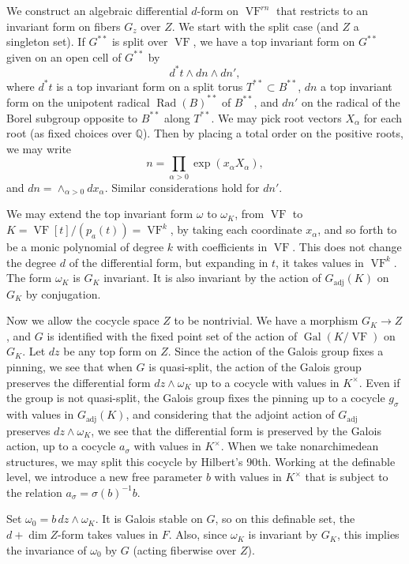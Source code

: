 \documentclass[12pt]{amsart}
\newcommand{\op}[1]{\operatorname{#1}}
\newcommand{\ring}[1]{{\mathbb #1}}
\def\VF{{\op{VF}}}
\theoremstyle{plain}
\theoremstyle{definition}
\begin{document}
We construct an algebraic differential $d$-form on $\VF^{rn}$ that
restricts to an invariant form on fibers $G_z$ over $Z$.  We start
with the split case (and $Z$ a singleton set).  If $G^{**}$ is split
over $\op{VF}$, we have a top invariant form on $G^{**}$ given on an
open cell of $G^{**}$ by
\begin{equation}
d^*t\land dn\land dn',
\end{equation}
where $d^*t$ is a top invariant form on a split torus $T^{**} \subset
B^{**}$, $dn$ a top invariant form on the unipotent
radical $\op{Rad}(B)^{**}$ of $B^{**}$, and $dn'$ on the radical of the Borel
subgroup opposite to $B^{**}$ along $T^{**}$.  We may pick root
vectors $X_\alpha$ for each root (as fixed choices over $\ring{Q}$).
Then by placing a total order on the positive roots, we may write 
\[
n = \prod_{\alpha>0}\exp(x_\alpha X_\alpha),
\]
and $dn = \land_{\alpha>0} dx_\alpha$.  Similar considerations hold
for $dn'$.

We may extend the top invariant form $\omega$ to $\omega_K$, from
$\VF$ to $K = \VF[t]/(p_a(t)) = \VF^k$, by taking each coordinate
$x_\alpha$, and so forth to be a monic polynomial of degree $k$ with
coefficients in $\VF$.  This does not change the degree $d$ of the
differential form, but expanding in $t$, it takes values in $\VF^k$.
The form $\omega_K$ is $G_K$ invariant.  It is also invariant by the
action of $G_{\op{adj}}(K)$ on $G_K$ by conjugation.

Now we allow the cocycle space $Z$ to be nontrivial.  We have a
morphism $G_K\to Z$, and $G$ is identified with the fixed point set of
the action of $\op{Gal}(K/\VF)$ on $G_K$.  Let $dz$ be any top form on
$Z$.  Since the action of the Galois group fixes a pinning, we see
that when $G$ is quasi-split, the action of the Galois group preserves
the differential form $dz\land \omega_K$ up to a cocycle with values
in $K^\times$.  Even if the group is not quasi-split, the Galois group
fixes the pinning up to a cocycle $g_\sigma$ with values in
$G_{\op{adj}}(K)$, and considering that the adjoint action of $G_{\op{adj}}$
preserves $dz\land \omega_K$, we see that the differential form is
preserved by the Galois action, up to a cocycle $a_\sigma$ with values
in $K^\times$.
When we take
nonarchimedean structures, we may split this cocycle by Hilbert's
90th.  Working at the definable level, we introduce a new free
parameter $b$ with values in $K^\times$ that is subject to the
relation $a_\sigma = \sigma(b)^{-1} b$.  

Set $\omega_0 = b\, dz\land\omega_K$.  It is Galois stable on
$G$, so on this definable set, the $d+\dim Z$-form takes values in $F$.
Also, since $\omega_K$ is invariant by $G_K$, this implies the
invariance of $\omega_0$ by $G$ (acting fiberwise over $Z$).  
\end{document}
